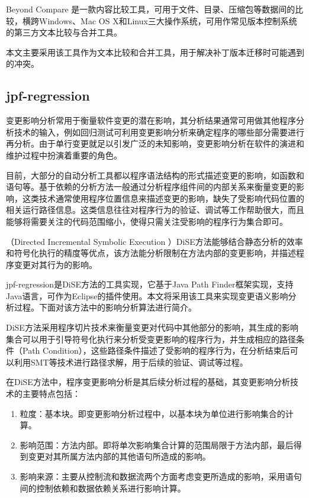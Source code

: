 Beyond Compare 是一款内容比较工具，可用于文件、目录、压缩包等数据间的比较，横跨Windows、Mac OS X和Linux三大操作系统，可用作常见版本控制系统的第三方文本比较与合并工具。
      
本文主要采用该工具作为文本比较和合并工具，用于解决补丁版本迁移时可能遇到的冲突。


	\subsection{jpf-regression} 
变更影响分析常用于衡量软件变更的潜在影响，其分析结果通常可用做其他程序分析技术的输入，例如回归测试可利用变更影响分析来确定程序的哪些部分需要进行再分析。由于单行变更就足以引发广泛的未知影响，变更影响分析在软件的演进和维护过程中扮演着重要的角色。\cite{rungta2012change}

目前，大部分的自动分析工具都以程序语法结构的形式描述变更的影响，如函数和语句等。基于依赖的分析方法一般通过分析程序组件间的内部关系来衡量变更的影响，这类技术通常使用程序位置信息来描述变更的影响，缺失了受影响代码位置的相关运行路径信息。这类信息往往对程序行为的验证、调试等工作帮助很大，而且能够将需要关注的代码范围缩小，使得只需关注受影响的程序行为集合即可。

（Directed Incremental Symbolic Execution ）DiSE\cite{person2011directed,yang2014directed}方法能够结合静态分析的效率和符号化执行的精度等优点，该方法能分析限制在方法内部的变更影响，并描述程序变更对其行为的影响。

jpf-regression是DiSE方法的工具实现，它基于Java Path Finder框架\cite{havelund2000model}实现，支持Java语言，可作为Eclipse的插件使用。本文将采用该工具来实现变更语义影响分析过程。下面对该方法中的影响分析算法进行简介。

DiSE方法采用程序切片技术来衡量变更对代码中其他部分的影响，其生成的影响集合可以用于引导符号化执行来分析受变更影响的程序行为，并生成相应的路径条件（Path Condition），这些路径条件描述了受影响的程序行为，在分析结束后可以利用SMT等技术进行路径求解，用于后续的验证、调试等过程。

在DiSE方法中，程序变更影响分析是其后续分析过程的基础，其变更影响分析技术的主要特点包括：
\begin{enumerate}
	\item 粒度：基本块。即变更影响分析过程中，以基本块为单位进行影响集合的计算。
	\item 影响范围：方法内部。即将单次影响集合计算的范围局限于方法内部，最后得到变更对其所属方法内部的其他语句所造成的影响。
	\item 影响来源：主要从控制流和数据流两个方面考虑变更所造成的影响，采用语句间的控制依赖和数据依赖关系进行影响计算。
\end{enumerate}

